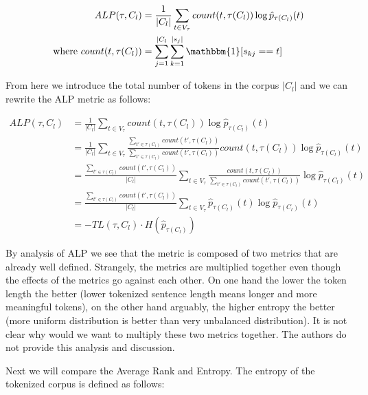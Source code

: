 \begin{align}
    ALP(\tau, C_l) &= \frac{1}{|C_l|} \sum_{t \in V_\tau} count(t, \tau(C_l)) \log \hat{p}_{\tau(C_l)}(t) \\
    \text{where}~count(t, \tau(C_l)) &= \sum_{j=1}^{|C_l} \sum_{k=1}^{|s_j|} \mathbbm{1}[s_{kj} == t]
\end{align}

From here we introduce the total number of tokens in the corpus $|C_l|$ and we can rewrite the ALP metric as follows:

\begin{align}
ALP(\tau, C_l) &= \frac{1}{|C_l|} \sum_{t \in V_\tau} count(t, \tau(C_l)) \log \hat{p}_{\tau(C_l)}(t) \\
&= \frac{1}{|C_l|} \sum_{t \in V_\tau} \frac{\sum_{t' \in \tau(C_l)} count(t', \tau(C_l))}{\sum_{t' \in \tau(C_l)} count(t', \tau(C_l))} count(t, \tau(C_l)) \log \hat{p}_{\tau(C_l)}(t) \\
&= \frac{\sum_{t' \in \tau(C_l)} count(t', \tau(C_l))}{|C_l|} \sum_{t \in V_\tau} \frac{count(t, \tau(C_l))}{\sum_{t' \in \tau(C_l)} count(t', \tau(C_l))} \log \hat{p}_{\tau(C_l)}(t) \\
&= \frac{\sum_{t' \in \tau(C_l)} count(t', \tau(C_l))}{|C_l|} \sum_{t \in V_\tau} \hat{p}_{\tau(C_l)}(t) \log \hat{p}_{\tau(C_l)}(t) \\
&= - TL(\tau, C_l) \cdot H(\hat{p}_{\tau(C_l)})
\end{align}


By analysis of ALP we see that the metric is composed of two metrics that are already well defined. Strangely, the metrics are multiplied together even though the effects of the metrics go against each other. On one hand the lower the token length the better (lower tokenized sentence length means longer and more meaningful tokens), on the other hand arguably, the higher entropy the better (more uniform distribution is better than very unbalanced distribution). It is not clear why would we want to multiply these two metrics together. The authors do not provide this analysis and discussion. 

Next we will compare the Average Rank and Entropy. The entropy of the tokenized corpus is defined as follows:

